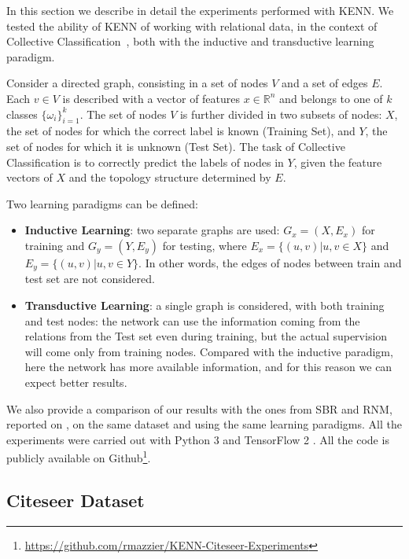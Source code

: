 In this section we describe in detail the experiments performed with KENN. We tested the ability of KENN of working with relational data, in the context of Collective Classification~\cite{sen2008collective}, both with the inductive and transductive learning paradigm. 

\begin{definition}
Consider a directed graph, consisting in a set of nodes $V$ and a set of edges $E$. Each $v \in V$ is described with a vector of features $x\in \mathbb{R}^n$ and belongs to one of $k$ classes $\{\omega_i\}_{i=1}^k$. The set of nodes $V$ is further divided in two subsets of nodes: $X$, the set of nodes for which the correct label is known (Training Set), and $Y$, the set of nodes for which it is unknown (Test Set). The task of Collective Classification is to correctly predict the labels of nodes in $Y$, given the feature vectors of $X$ and the topology structure determined by $E$. 
\end{definition}
Two learning paradigms can be defined:

\begin{itemize}
	\item \textbf{Inductive Learning}: two separate graphs are used: $G_x = (X,E_x)$ for training and $G_y = (Y, E_y)$ for testing, where $E_x = \{(u,v) | u,v\in X\}$ and $E_y = \{(u,v) | u,v\in Y\}$. In other words, the edges of nodes between train and test set are not considered.
	\item \textbf{Transductive Learning}: a single graph is considered, with both training and test nodes: the network can use the information coming from the relations from the Test set even during training, but the actual supervision will come only from training nodes. Compared with the inductive paradigm, here the network has more available information, and for this reason we can expect better results.
\end{itemize}

We also provide a comparison of our results with the ones from SBR and RNM, reported on \cite{marra2020relational}, on the same dataset and using the same learning paradigms. All the experiments were carried out with Python 3 and TensorFlow 2 \cite{abadi2016tensorflow}. All the code is publicly available on Github\footnote{\url{https://github.com/rmazzier/KENN-Citeseer-Experiments}}.

\subsection{Citeseer Dataset}

